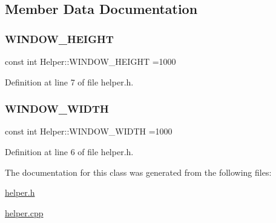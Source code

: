\subsection{Member Data Documentation}
\mbox{\label{class_helper_a92080f2e118c556e3b9629698c5ca896}} 
\subsubsection{\texorpdfstring{W\+I\+N\+D\+O\+W\+\_\+\+H\+E\+I\+G\+HT}{WINDOW\_HEIGHT}}
{\footnotesize\ttfamily const int Helper\+::\+W\+I\+N\+D\+O\+W\+\_\+\+H\+E\+I\+G\+HT =1000\hspace{0.3cm}{\ttfamily [static]}}



Definition at line 7 of file helper.\+h.

\mbox{\label{class_helper_ad4164c542e99e3ef2ccdd49866fc35b8}} 
\subsubsection{\texorpdfstring{W\+I\+N\+D\+O\+W\+\_\+\+W\+I\+D\+TH}{WINDOW\_WIDTH}}
{\footnotesize\ttfamily const int Helper\+::\+W\+I\+N\+D\+O\+W\+\_\+\+W\+I\+D\+TH =1000\hspace{0.3cm}{\ttfamily [static]}}



Definition at line 6 of file helper.\+h.



The documentation for this class was generated from the following files\+:\begin{DoxyCompactItemize}
\item 
\mbox{\hyperlink{helper_8h}{helper.\+h}}\item 
\mbox{\hyperlink{helper_8cpp}{helper.\+cpp}}\end{DoxyCompactItemize}
